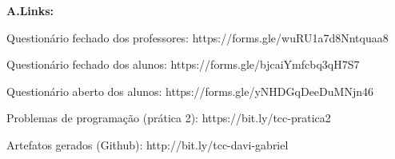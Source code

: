 \textbf{A.\quad Links:}

Questionário fechado dos professores:
https://forms.gle/wuRU1a7d8Nntquaa8

Questionário fechado dos alunos:
https://forms.gle/bjcaiYmfcbq3qH7S7

Questionário aberto dos alunos:
https://forms.gle/yNHDGqDeeDuMNjn46

Problemas de programação (prática 2):
https://bit.ly/tcc-pratica2

Artefatos gerados (Github):
http://bit.ly/tcc-davi-gabriel

\ \